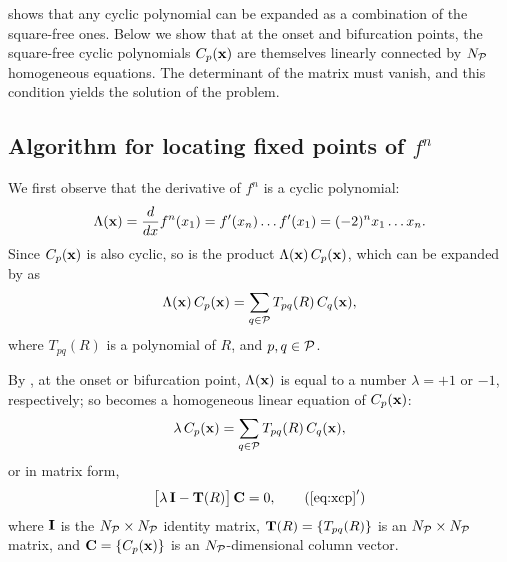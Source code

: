 \documentclass[twocolumn]{revtex4-1}
\begin{document}
  shows that any cyclic polynomial can be expanded
  as a combination of the square-free ones.
Below we show that at the onset and bifurcation points,
  the square-free cyclic polynomials $C_p(\mathbf{x})$ are themselves
  linearly connected by $N_\mathcal P$ homogeneous equations.
The determinant of the matrix must vanish,
  and this condition yields the solution of the problem.


\subsection{\label{sec:algo}Algorithm for locating fixed points of $f^n$}


We first observe that the derivative of $f^n$
is a cyclic polynomial:
%
%
\begin{equation}
  \Lambda(\mathbf{x})
   = \frac{d}{dx}f^{n}(x_1)
   = f'(x_n) \dots f'(x_1)
   = (-2)^n x_1 \dots x_n.
\label{eq:logder}
\end{equation}
%
%
Since $C_p(\mathbf{x})$ is also cyclic,
  so is the product $\Lambda(\mathbf{x}) \, C_p(\mathbf{x})$,
  which can be expanded by  as
\begin{equation}
  \Lambda(\mathbf{x}) \, C_p(\mathbf{x}) = \sum_{q \in \mathcal P} T_{pq}(R) \, C_q(\mathbf{x}),
\label{eq:xcp0}
\end{equation}
where $T_{pq}(R)$ is a polynomial of $R$,
and $p, q \in \mathcal P$.



By , at the onset or bifurcation point,
  $\Lambda(\mathbf{x})$ is equal to a number
  $\lambda = +1$ or $-1$, respectively;
  so 
  becomes a homogeneous linear equation of
  $C_p(\mathbf{x})$:
\begin{equation}
  \lambda \, C_p(\mathbf{x}) = \sum_{q \in \mathcal P} T_{pq}(R) \, C_q(\mathbf{x}),
\label{eq:xcp}
\end{equation}
%
%
or in matrix form,
\begin{equation}
  \big[ \lambda \, \vct I - \vct T(R) \big] \, \vct C = 0,
\tag{$\ref{eq:xcp}'$}
\end{equation}
%
%
where
$\mathbf{I}$ is the $N_\mathcal P \times N_\mathcal P$ identity matrix,
$\mathbf{T}(R) = \{T_{pq}(R)\}$ is an $N_\mathcal P \times N_\mathcal P$ matrix,
and
$\mathbf{C} = \{C_p(\mathbf{x})\}$ is an $N_\mathcal P$-dimensional column vector.
\end{document}
